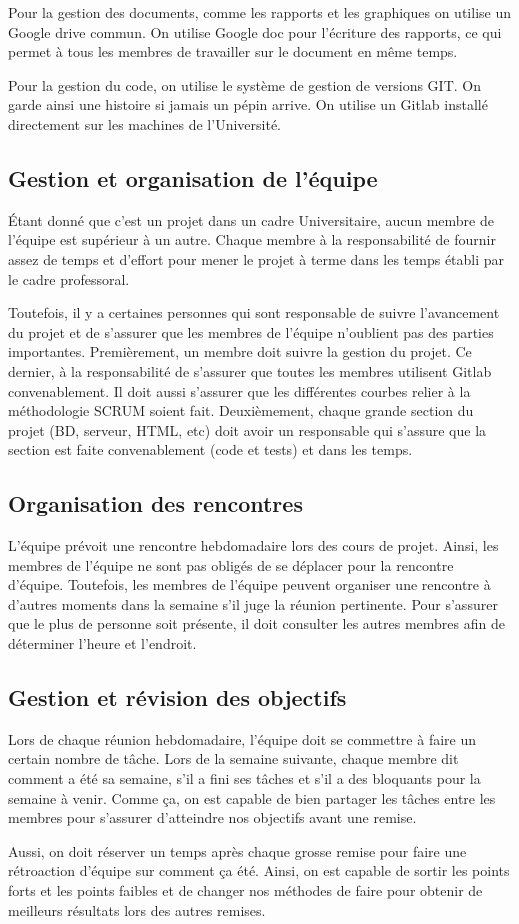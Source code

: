 	Pour la gestion des documents, comme les rapports et les graphiques on utilise un Google drive commun. On utilise Google doc pour l’écriture des rapports, ce qui permet à tous les membres de travailler sur le document en même temps.
 
	Pour la gestion du code, on utilise le système de gestion de versions GIT. On garde ainsi une histoire si jamais un pépin arrive. On utilise un Gitlab installé directement sur les machines de l’Université. 

	\subsection{Gestion et organisation de l'équipe}
	Étant donné que c’est un projet dans un cadre Universitaire, aucun membre de l’équipe est supérieur à un autre. Chaque membre à la responsabilité de fournir assez de temps et d’effort pour mener le projet à terme dans les temps établi par le cadre professoral.
 
	Toutefois, il y a certaines personnes qui sont responsable de suivre l’avancement du projet et de s’assurer que les membres de l’équipe n’oublient pas des parties importantes. Premièrement, un membre doit suivre la gestion du projet. Ce dernier, à la responsabilité de s’assurer que toutes les membres utilisent Gitlab convenablement. Il doit aussi s’assurer que les différentes courbes relier à la méthodologie SCRUM soient fait. Deuxièmement, chaque grande section du projet (BD, serveur, HTML, etc) doit avoir un responsable qui s’assure que la section est faite convenablement (code et tests) et dans les temps.

	\subsection{Organisation des rencontres}
	L’équipe prévoit une rencontre hebdomadaire lors des cours de projet. Ainsi, les membres de l’équipe ne sont pas obligés de se déplacer pour la rencontre d’équipe. Toutefois, les membres de l’équipe peuvent organiser une rencontre à d’autres moments dans la semaine s’il juge la réunion pertinente. Pour s’assurer que le plus de personne soit présente, il doit consulter les autres membres afin de déterminer l’heure et l’endroit.

	\subsection{Gestion et révision des objectifs}
	Lors de chaque réunion hebdomadaire, l’équipe doit se commettre à faire un certain nombre de tâche. Lors de la semaine suivante, chaque membre dit comment a été sa semaine, s’il a fini ses tâches et s’il a des bloquants pour la semaine à venir. Comme ça, on est capable de bien partager les tâches entre les membres pour s’assurer d’atteindre nos objectifs avant une remise.

	Aussi, on doit réserver un temps après chaque grosse remise pour faire une rétroaction d’équipe sur comment ça été. Ainsi, on est capable de sortir les points forts et les points faibles et de changer nos méthodes de faire pour obtenir de meilleurs résultats lors des autres remises.
